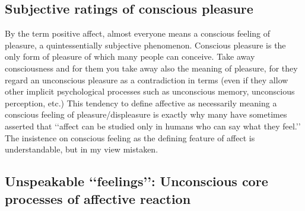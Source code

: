 \documentclass[conference]{IEEEtran}
\begin{document}
\subsection{Subjective ratings of conscious pleasure}
By the term positive affect, almost everyone means a
conscious feeling of pleasure, a quintessentially subjective
phenomenon. Conscious pleasure is the only form of
pleasure of which many people can conceive. Take away
consciousness and for them you take away also the
meaning of pleasure, for they regard an unconscious
pleasure as a contradiction in terms (even if they allow
other implicit psychological processes such as unconscious memory, unconscious perception, etc.) This
tendency to define affective as necessarily meaning a
conscious feeling of pleasure/displeasure is exactly why
many have sometimes asserted that ‘‘affect can be studied
only in humans who can say what they feel.’’ The insistence on conscious feeling as the defining feature of affect
is understandable, but in my view mistaken.

\subsection{ Unspeakable ‘‘feelings’’: Unconscious core processes of affective reaction}
\end{document}
